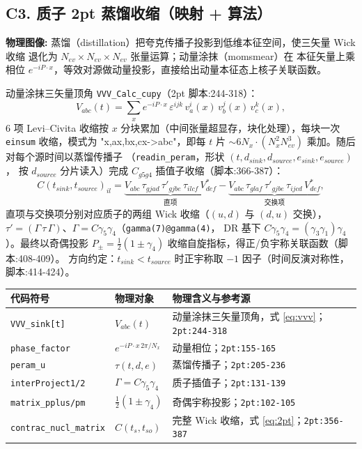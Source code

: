 \documentclass[UTF8]{ctexart}
\begin{document}
\subsection{C3. 质子 2pt 蒸馏收缩（映射 + 算法）}

\begin{physbox}
\textbf{物理图像:} 蒸馏（distillation）把夸克传播子投影到低维本征空间，使三矢量 Wick 收缩
退化为 $N_{ev}\times N_{ev}\times N_{ev}$ 张量运算；动量涂抹（mom\textunderscore smear）在
本征矢量上乘相位 $e^{-iP\cdot x}$，等效对源做动量投影，直接给出动量本征态上核子关联函数。
\end{physbox}

动量涂抹三矢量顶角 \texttt{\nolinkurl{VVV_Calc_cupy}}（2pt 脚本:244-318）：
\begin{equation}\label{eq:vvv}
V_{abc}(t)=\sum_x e^{-iP\cdot x}\,\varepsilon^{ijk}\,v^i_a(x)\,v^j_b(x)\,v^k_c(x),
\end{equation}
6 项 Levi--Civita 收缩按 $x$ 分块累加（中间张量超显存，块化处理），每块一次
\texttt{einsum} 收缩，模式为 "x,ax,bx,cx->abc"，即每 $t$ 片
$\sim 6 N_x \cdot (N_x^2 N_{ev}^3)$ 乘加。随后对每个源时间以蒸馏传播子
（\texttt{\nolinkurl{readin_peram}}，形状 $(t,d_{sink},d_{source},e_{sink},e_{source})$，
按 $d_{source}$ 分片读入）完成
$C_{g5g4}$ 插值子收缩（脚本:366-387）：
\begin{equation}\label{eq:2pt}
C(t_{sink},t_{source})_{il}=\underbrace{V_{abc}\,\tau_{gjad}\,\tau'_{gjbe}\,\tau_{ilcf}\,V^*_{def}}_{\text{直项}}
-\underbrace{V_{abc}\,\tau_{glaf}\,\tau'_{gjbe}\,\tau_{ijcd}\,V^*_{def}}_{\text{交换项}},
\end{equation}
直项与交换项分别对应质子的两组 Wick 收缩（$(u,d)$ 与 $(d,u)$ 交换），
$\tau'=(\Gamma\,\tau\,\Gamma)$、$\Gamma=C\gamma_5\gamma_4$（\texttt{gamma(7)@gamma(4)}，
DR 基下 $C\gamma_5\gamma_4=(\gamma_3\gamma_1)\gamma_4$）。最终以奇偶投影
$P_\pm=\frac12(1\pm\gamma_4)$ 收缩自旋指标，得正/负宇称关联函数（脚本:408-409）。
方向约定：$t_{sink}<t_{source}$ 时正宇称取 $-1$ 因子（时间反演对称性，脚本:414-424）。

\begin{xltabular}{\textwidth}{llX}
\toprule
\textcolor{map}{代码符号} & 物理对象 & 物理含义与参考源 \\
\midrule
\endhead
\texttt{VVV\_sink[t]} & $V_{abc}(t)$ & 动量涂抹三矢量顶角，式 \eqref{eq:vvv}；\texttt{\nolinkurl{2pt:244-318}} \\
\texttt{phase\_factor} & $e^{-iP\cdot x\,2\pi/N_x}$ & 动量相位；\texttt{\nolinkurl{2pt:155-165}} \\
\texttt{peram\_u} & $\tau(t,d,e)$ & 蒸馏传播子；\texttt{\nolinkurl{2pt:205-236}} \\
\texttt{interProject1/2} & $\Gamma=C\gamma_5\gamma_4$ & 质子插值子；\texttt{\nolinkurl{2pt:131-139}} \\
\texttt{matrix\_pplus/pm} & $\frac12(1\pm\gamma_4)$ & 奇偶宇称投影；\texttt{\nolinkurl{2pt:102-105}} \\
\texttt{contrac\_nucl\_matrix} & $C(t_s,t_{so})$ & 完整 Wick 收缩，式 \eqref{eq:2pt}；\texttt{\nolinkurl{2pt:356-387}} \\
\bottomrule
\end{xltabular}
\end{document}
